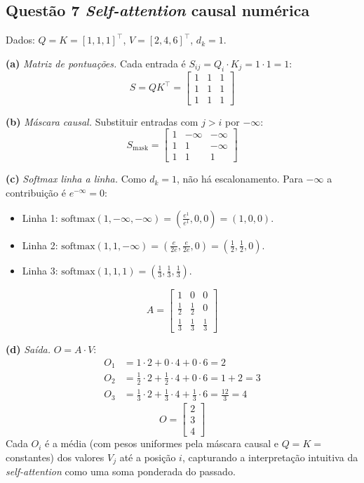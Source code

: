 \documentclass[11pt,a4paper]{article}
\begin{document}
\subsection*{Questão 7 \textemdash{} \textit{Self-attention} causal numérica}

Dados: $Q = K = [1, 1, 1]^\top$, $V = [2, 4, 6]^\top$, $d_k = 1$.

\textbf{(a)} \textit{Matriz de pontuações.} Cada entrada é $S_{ij} = Q_i \cdot K_j = 1 \cdot 1 = 1$:
\[
S = QK^\top = \begin{bmatrix}
1 & 1 & 1 \\
1 & 1 & 1 \\
1 & 1 & 1
\end{bmatrix}
\]

\textbf{(b)} \textit{Máscara causal.} Substituir entradas com $j > i$ por $-\infty$:
\[
S_\text{mask} = \begin{bmatrix}
1      & -\infty & -\infty \\
1      & 1       & -\infty \\
1      & 1       & 1
\end{bmatrix}
\]

\textbf{(c)} \textit{Softmax linha a linha.} Como $d_k = 1$, não há escalonamento. Para $-\infty$ a contribuição é $e^{-\infty} = 0$:
\begin{itemize}
    \item Linha 1: $\mathrm{softmax}(1, -\infty, -\infty) = \left(\tfrac{e^1}{e^1}, 0, 0\right) = (1, 0, 0)$.
    \item Linha 2: $\mathrm{softmax}(1, 1, -\infty) = \left(\tfrac{e}{2e}, \tfrac{e}{2e}, 0\right) = (\tfrac{1}{2}, \tfrac{1}{2}, 0)$.
    \item Linha 3: $\mathrm{softmax}(1, 1, 1) = (\tfrac{1}{3}, \tfrac{1}{3}, \tfrac{1}{3})$.
\end{itemize}
\[
A = \begin{bmatrix}
1            & 0            & 0            \\
\tfrac{1}{2} & \tfrac{1}{2} & 0            \\
\tfrac{1}{3} & \tfrac{1}{3} & \tfrac{1}{3}
\end{bmatrix}
\]

\textbf{(d)} \textit{Saída.} $O = A \cdot V$:
\begin{align*}
O_1 &= 1 \cdot 2 + 0 \cdot 4 + 0 \cdot 6 = 2 \\
O_2 &= \tfrac{1}{2} \cdot 2 + \tfrac{1}{2} \cdot 4 + 0 \cdot 6 = 1 + 2 = 3 \\
O_3 &= \tfrac{1}{3} \cdot 2 + \tfrac{1}{3} \cdot 4 + \tfrac{1}{3} \cdot 6 = \tfrac{12}{3} = 4
\end{align*}
\[
O = \begin{bmatrix} 2 \\ 3 \\ 4 \end{bmatrix}
\]
Cada $O_i$ é a média (com pesos uniformes pela máscara causal e $Q = K = $ constantes) dos valores $V_j$ até a posição $i$, capturando a interpretação intuitiva da \textit{self-attention} como uma soma ponderada do passado.

\color{black}
\end{document}
